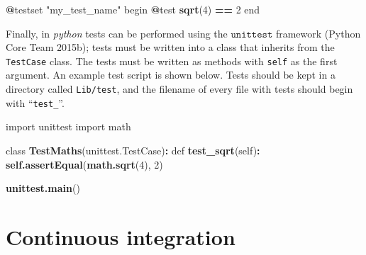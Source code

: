 \documentclass[]{elsarticle} %
\newenvironment{Shaded}{\begin{snugshade}}{\end{snugshade}}
\newcommand{\DecValTok}[1]{\textcolor[rgb]{0.00,0.00,0.81}{#1}}
\newcommand{\KeywordTok}[1]{\textcolor[rgb]{0.13,0.29,0.53}{\textbf{#1}}}
\newcommand{\NormalTok}[1]{#1}
\newcommand{\OperatorTok}[1]{\textcolor[rgb]{0.81,0.36,0.00}{\textbf{#1}}}
\newcommand{\StringTok}[1]{\textcolor[rgb]{0.31,0.60,0.02}{#1}}
\begin{document}
\begin{Shaded}
\begin{Highlighting}[]
\OperatorTok{@}\NormalTok{testset }\StringTok{"my_test_name"}\NormalTok{ begin}
  \OperatorTok{@}\NormalTok{test }\KeywordTok{sqrt}\NormalTok{(}\DecValTok{4}\NormalTok{) }\OperatorTok{==}\StringTok{ }\DecValTok{2}
\NormalTok{end}
\end{Highlighting}
\end{Shaded}

Finally, in \emph{python} tests can be performed using the \(\texttt{unittest}\) framework (Python Core Team 2015b); tests must be written into a class that inherits from the \texttt{TestCase} class.
The tests must be written as methods with \texttt{self} as the first argument.
An example test script is shown below.
Tests should be kept in a directory called \texttt{Lib/test}, and the filename of every file with tests should begin with ``\texttt{test\_}''.
\newline
{}\label{testpy}

\begin{Shaded}
\begin{Highlighting}[]
\NormalTok{import unittest}
\NormalTok{import math}

\NormalTok{class }\KeywordTok{TestMaths}\NormalTok{(unittest.TestCase)}\OperatorTok{:}
\StringTok{    }\NormalTok{def }\KeywordTok{test_sqrt}\NormalTok{(self)}\OperatorTok{:}
\StringTok{        }\KeywordTok{self.assertEqual}\NormalTok{(}\KeywordTok{math.sqrt}\NormalTok{(}\DecValTok{4}\NormalTok{), }\DecValTok{2}\NormalTok{)}

\KeywordTok{unittest.main}\NormalTok{()}
\end{Highlighting}
\end{Shaded}

\hypertarget{ci}{%
\section{Continuous integration}\label{ci}}
\end{document}
